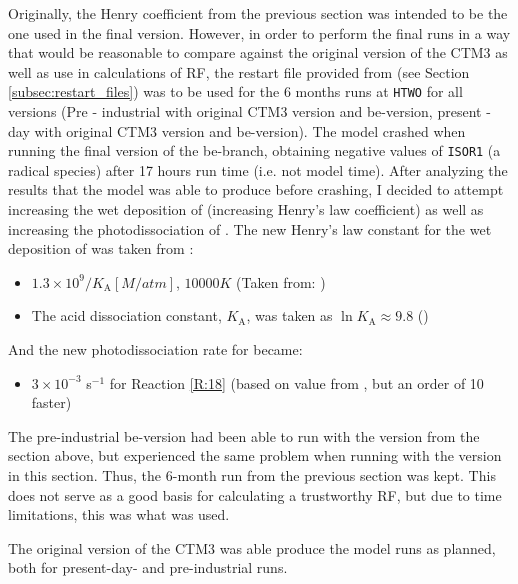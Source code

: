 Originally, the Henry coefficient from the previous section was intended to be the one used in the final version. However, in order to perform the final runs in a way that would be reasonable to compare against the original version of the CTM3 as well as use in calculations of RF, the restart file provided from \cite{StefaniePersonal} (see Section \ref{subsec:restart_files}) was to be used for the 6 months runs at \texttt{HTWO} for all versions (Pre - industrial with original CTM3 version and \acrshort{be}-version, present - day with original CTM3 version and \acrshort{be}-version). The model crashed when running the final version of the \acrshort{be}-branch, obtaining negative values of \texttt{ISOR1} (a radical species) after 17 hours run time (i.e. not model time). After analyzing the results that the model was able to produce before crashing, I decided to attempt increasing the wet deposition of  (increasing Henry's law coefficient) as well as increasing the photodissociation of . The new Henry's law constant for the wet deposition of  was taken from \cite{Sander99}: 

\begin{itemize}
    \item $1.3\times10^9/K_\text{A} [M/atm]$, $10 000 K$ (Taken from: \cite{Brimblecombe1988TheSA})
    \item The acid dissociation constant, $K_\text{A}$, was taken as $\ln{K_\text{A}} \approx 9.8$ (\cite{Levanov})
\end{itemize}

And the new photodissociation rate for  became:

\begin{itemize}
    \item $3\times10^{-3}$ s$^{-1}$ for Reaction \ref{R:18} (based on value from \cite{CAO}, but an order of 10 faster)
\end{itemize}

The pre-industrial \acrshort{be}-version had been able to run with the version from the section above, but experienced the same problem when running with the version in this section. Thus, the 6-month run from the previous section was kept. This does not serve as a good basis for calculating a trustworthy RF, but due to time limitations, this was what was used. 

\medskip

The original version of the CTM3 was able produce the model runs as planned, both for present-day- and pre-industrial runs. 

